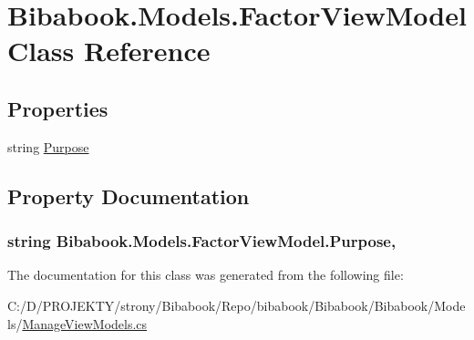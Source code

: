 \hypertarget{class_bibabook_1_1_models_1_1_factor_view_model}{}\section{Bibabook.\+Models.\+Factor\+View\+Model Class Reference}
\label{class_bibabook_1_1_models_1_1_factor_view_model}
\subsection*{Properties}
\begin{DoxyCompactItemize}
\item 
string \hyperlink{class_bibabook_1_1_models_1_1_factor_view_model_a0b4e7fbc75023d1b5538649a06d123ea}{Purpose}
\end{DoxyCompactItemize}


\subsection{Property Documentation}
\hypertarget{class_bibabook_1_1_models_1_1_factor_view_model_a0b4e7fbc75023d1b5538649a06d123ea}{}
\subsubsection[{Purpose}]{\setlength{\rightskip}{0pt plus 5cm}string Bibabook.\+Models.\+Factor\+View\+Model.\+Purpose\hspace{0.3cm}{\ttfamily [get]}, {\ttfamily [set]}}\label{class_bibabook_1_1_models_1_1_factor_view_model_a0b4e7fbc75023d1b5538649a06d123ea}


The documentation for this class was generated from the following file\+:\begin{DoxyCompactItemize}
\item 
C\+:/\+D/\+P\+R\+O\+J\+E\+K\+T\+Y/strony/\+Bibabook/\+Repo/bibabook/\+Bibabook/\+Bibabook/\+Models/\hyperlink{_manage_view_models_8cs}{Manage\+View\+Models.\+cs}\end{DoxyCompactItemize}
